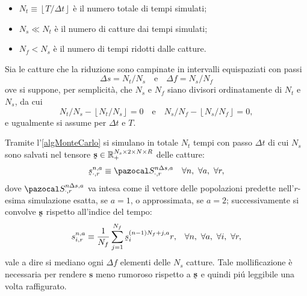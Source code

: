             \begin{itemize}[
                label=\(\diamond\),
                topsep=0.5em,
                parsep=0em,
                itemsep=0.25em,
                leftmargin=2em,
                rightmargin=1.5em,
                labelindent=30pt,
            ]
                \item \(N_t\equiv\left\lfloor T/\Delta t\right\rfloor\) è il numero totale di tempi simulati;
                \item \(N_s\ll N_t\) è il numero di catture dai tempi simulati;
                \item \(N_f<N_s\) è il numero di tempi ridotti dalle catture.
            \end{itemize}

            Sia le catture che la riduzione sono campinate in intervalli equispaziati con passi
            \begin{equation*}
                \Delta s=N_t/N_s
                \quad\text{e}\quad
                \Delta f=N_s/N_f
            \end{equation*}
            ove si suppone, per semplicità, che \(N_s\) e \(N_f\) siano divisori ordinatamente di \(N_t\) e \(N_s\), da cui
            \begin{equation*}
                N_t/N_s-\left\lfloor N_t/N_s\right\rfloor=0
                \quad\text{e}\quad
                N_s/N_f-\left\lfloor N_s/N_f\right\rfloor=0,
            \end{equation*}
            e ugualmente si assume per \(\Delta t\) e \(T\).
            
            Tramite l'\cref{algMonteCarlo} si simulano in totale \(N_t\) tempi con passo \(\Delta t\) di cui \(N_s\) sono salvati nel tensore \(\undertilde{\mathbf s}\in\RPlus^{N_s\times2\times N\times R}\) delle catture:
            \begin{equation*}
                \undertilde s^{n,a}_{\cdot,r}\equiv\pazocal S^{n\Delta s,a}_{\cdot,r}
                \quad\forall n,\ \forall a,\ \forall r,
            \end{equation*}
            dove \(\pazocal S^{n\Delta s,a}_{\cdot,r}\) va intesa come il vettore delle popolazioni predette nell'\(r\)-esima simulazione esatta, se \(a=1\), o approssimata, se \(a=2\); successivamente si convolve \(\undertilde{\mathbf s}\) rispetto all'indice del tempo:
            \begin{equation*}
                s^{n,a}_{i,r}\equiv\frac1{N_f}\sum_{j=1}^{N_f}\undertilde s^{(n-1)N_f+j,a}_ir{,}
                \quad\forall n,\ \forall a,\ \forall i,\ \forall r,
            \end{equation*}
            vale a dire si mediano ogni \(\Delta f\) elementi delle \(N_s\) catture. Tale mollificazione è necessaria per rendere \(\mathbf s\) meno rumoroso rispetto a \(\undertilde{\mathbf s}\) e quindi piú leggibile una volta raffigurato.

